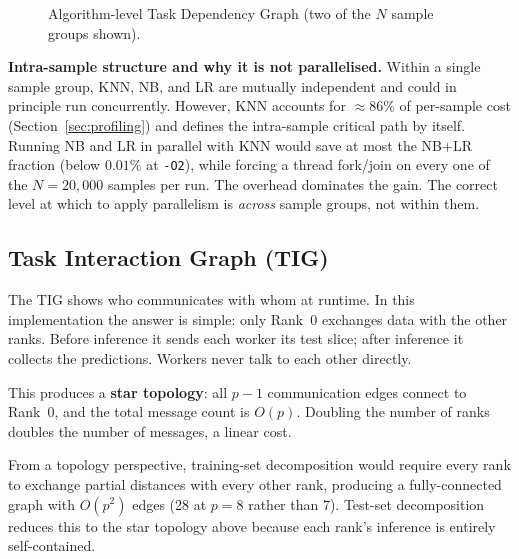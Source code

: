 \documentclass[12pt,a4paper]{article}
\begin{document}
\begin{figure}[H]
\caption{Algorithm-level Task Dependency Graph (two of the $N$ sample groups shown).}
\label{fig:tdg_full}
\end{figure}

\textbf{Intra-sample structure and why it is not parallelised.}
Within a single sample group, KNN, NB, and LR are mutually independent
and could in principle run concurrently. However, KNN accounts for $\approx 86\%$ of per-sample cost
(Section~\ref{sec:profiling}) and defines the intra-sample critical path
by itself. Running NB and LR in parallel with KNN would save at most the
NB+LR fraction (below $0.01\%$ at \texttt{-O2}), while forcing a
thread fork/join on every one of the $N = 20{,}000$ samples per run.
The overhead dominates the gain. The correct level at which to
apply parallelism is \emph{across} sample groups, not within them.

\subsection{Task Interaction Graph (TIG)}

The TIG shows who communicates with whom at runtime. In this implementation
the answer is simple: only Rank~0 exchanges data with the other ranks.
Before inference it sends each worker its test slice; after inference it
collects the predictions. Workers never talk to each other directly.

This produces a \textbf{star topology}: all $p-1$ communication edges
connect to Rank~0, and the total message count is $O(p)$. Doubling the
number of ranks doubles the number of messages, a linear cost.

From a topology perspective, training-set decomposition would require every
rank to exchange partial distances with every other rank, producing a
fully-connected graph with $O(p^2)$ edges (28 at $p=8$ rather than 7).
Test-set decomposition reduces this to the star topology above because
each rank's inference is entirely self-contained.
\end{document}
